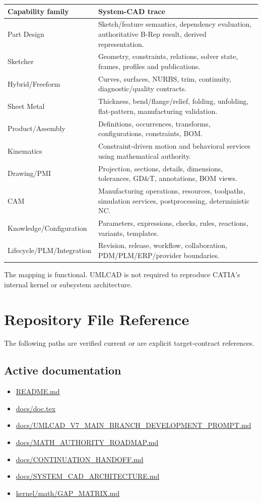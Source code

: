 \documentclass[11pt,a4paper]{report}
\newcommand{\pathref}[1]{\url{#1}}
\begin{document}
\begin{longtable}{@{}p{}p{}@{}}
\toprule
Capability family & System-CAD trace \\
\midrule
Part Design & Sketch/feature semantics, dependency evaluation, authoritative B-Rep result, derived representation. \\
Sketcher & Geometry, constraints, relations, solver state, frames, profiles and publications. \\
Hybrid/Freeform & Curves, surfaces, NURBS, trim, continuity, diagnostic/quality contracts. \\
Sheet Metal & Thickness, bend/flange/relief, folding, unfolding, flat-pattern, manufacturing validation. \\
Product/Assembly & Definitions, occurrences, transforms, configurations, constraints, BOM. \\
Kinematics & Constraint-driven motion and behavioral services using mathematical authority. \\
Drawing/PMI & Projection, sections, details, dimensions, tolerances, GD\&T, annotations, BOM views. \\
CAM & Manufacturing operations, resources, toolpaths, simulation services, postprocessing, deterministic NC. \\
Knowledge/Configuration & Parameters, expressions, checks, rules, reactions, variants, templates. \\
Lifecycle/PLM/Integration & Revision, release, workflow, collaboration, PDM/PLM/ERP/provider boundaries. \\
\bottomrule
\end{longtable}

The mapping is functional. UMLCAD is not required to reproduce CATIA's internal kernel or subsystem architecture.

\chapter{Repository File Reference}

The following paths are verified current or are explicit target-contract references.

\section{Active documentation}
\begin{itemize}
\item \pathref{README.md}
\item \pathref{docs/doc.tex}
\item \pathref{docs/UMLCAD_V7_MAIN_BRANCH_DEVELOPMENT_PROMPT.md}
\item \pathref{docs/MATH_AUTHORITY_ROADMAP.md}
\item \pathref{docs/CONTINUATION_HANDOFF.md}
\item \pathref{docs/SYSTEM_CAD_ARCHITECTURE.md}
\item \pathref{kernel/math/GAP_MATRIX.md}
\end{itemize}
\end{document}
